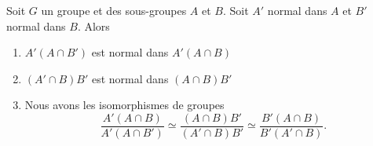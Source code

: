 \begin{lemma}\label{LemsKpXCG}
    Soit \( G\) un groupe et des sous-groupes \( A\) et \( B\). Soit \( A'\) normal dans \( A\) et \( B'\) normal dans \( B\). Alors
    \begin{enumerate}
        \item
            \( A'(A\cap B')\) est normal dans \( A'(A\cap B)\)
        \item
            \( (A'\cap B)B'\) est normal dans \( (A\cap B)B'\)
        \item
            Nous avons les isomorphismes de groupes
            \begin{equation}
                \frac{ A'(A\cap B) }{ A'(A\cap B') }\simeq\frac{ (A\cap B)B' }{ (A'\cap B)B' }\simeq\frac{ B'(A\cap B) }{ B'(A'\cap B) }.
            \end{equation}
    \end{enumerate}
\end{lemma}

